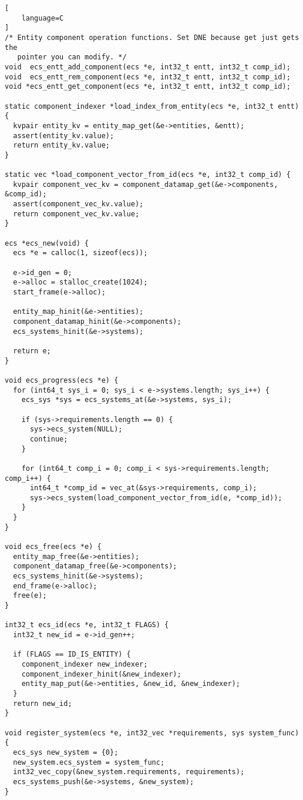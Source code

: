 \begin{lstlisting}[
    language=C
]
/* Entity component operation functions. Set DNE because get just gets the
   pointer you can modify. */
void  ecs_entt_add_component(ecs *e, int32_t entt, int32_t comp_id);
void  ecs_entt_rem_component(ecs *e, int32_t entt, int32_t comp_id);
void *ecs_entt_get_component(ecs *e, int32_t entt, int32_t comp_id);

static component_indexer *load_index_from_entity(ecs *e, int32_t entt) {
  kvpair entity_kv = entity_map_get(&e->entities, &entt);
  assert(entity_kv.value);
  return entity_kv.value;
}

static vec *load_component_vector_from_id(ecs *e, int32_t comp_id) {
  kvpair component_vec_kv = component_datamap_get(&e->components, &comp_id);
  assert(component_vec_kv.value);
  return component_vec_kv.value;
}

ecs *ecs_new(void) {
  ecs *e = calloc(1, sizeof(ecs));

  e->id_gen = 0;
  e->alloc = stalloc_create(1024);
  start_frame(e->alloc);

  entity_map_hinit(&e->entities);
  component_datamap_hinit(&e->components);
  ecs_systems_hinit(&e->systems);

  return e;
}

void ecs_progress(ecs *e) {
  for (int64_t sys_i = 0; sys_i < e->systems.length; sys_i++) {
    ecs_sys *sys = ecs_systems_at(&e->systems, sys_i);

    if (sys->requirements.length == 0) {
      sys->ecs_system(NULL);
      continue;
    }

    for (int64_t comp_i = 0; comp_i < sys->requirements.length; comp_i++) {
      int64_t *comp_id = vec_at(&sys->requirements, comp_i);
      sys->ecs_system(load_component_vector_from_id(e, *comp_id));
    }
  }
}

void ecs_free(ecs *e) {
  entity_map_free(&e->entities);
  component_datamap_free(&e->components);
  ecs_systems_hinit(&e->systems);
  end_frame(e->alloc);
  free(e);
}

int32_t ecs_id(ecs *e, int32_t FLAGS) {
  int32_t new_id = e->id_gen++;

  if (FLAGS == ID_IS_ENTITY) {
    component_indexer new_indexer;
    component_indexer_hinit(&new_indexer);
    entity_map_put(&e->entities, &new_id, &new_indexer);
  }
  return new_id;
}

void register_system(ecs *e, int32_vec *requirements, sys system_func) {
  ecs_sys new_system = {0};
  new_system.ecs_system = system_func;
  int32_vec_copy(&new_system.requirements, requirements);
  ecs_systems_push(&e->systems, &new_system);
}


\end{lstlisting}

